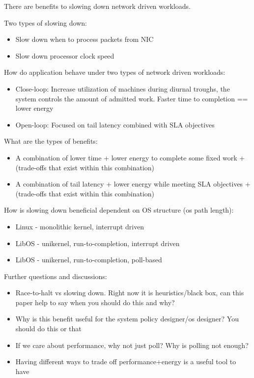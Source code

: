 \label{sec:intro}
There are benefits to slowing down network driven workloads.

Two types of slowing down:
\begin{itemize}
    \item Slow down when to process packets from NIC
    \item Slow down processor clock speed
\end{itemize}

How do application behave under two types of network driven workloads:
\begin{itemize}
    \item Close-loop: Increase utilization of machines during diurnal troughs, the system controls the amount of admitted work. Faster time to completion == lower energy
    \item Open-loop: Focused on tail latency combined with SLA objectives
\end{itemize}

What are the types of benefits:
\begin{itemize}
    \item A combination of lower time + lower energy to complete some fixed work + (trade-offs that exist within this combination)
    \item A combination of tail latency + lower energy while meeting SLA objectives + (trade-offs that exist within this combination)
\end{itemize}

How is slowing down beneficial dependent on OS structure (os path length):
\begin{itemize}
    \item Linux - monolithic kernel, interrupt driven
    \item LibOS - unikernel, run-to-completion, interrupt driven
    \item LibOS - unikernel, run-to-completion, poll-based
\end{itemize}

Further questions and discussions:
\begin{itemize}
    \item Race-to-halt vs slowing down. Right now it is heuristics/black box, can this paper help to say when you should do this and why?
    \item Why is this benefit useful for the system policy designer/os designer? You should do this or that
    \item If we care about performance, why not just poll? Why is polling not enough?
    \item Having different ways to trade off performance+energy is a useful tool to have
\end{itemize}

